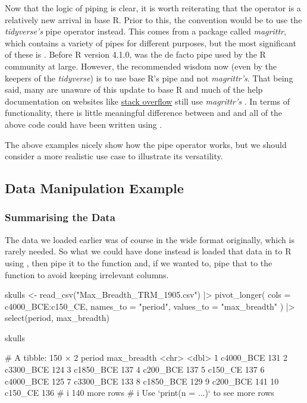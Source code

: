 Now that the logic of piping is clear, it is worth reiterating that the \R{|>} operator is a relatively new arrival in base R. Prior to this, the convention would be to use the \textit{tidyverse's} pipe operator \R{\%>\%} instead. This comes from a package called \textit{magrittr}, which contains a variety of pipes for different purposes, but the most significant of these is \R{\%>\%}. Before R version  4.1.0, \R{\%>\%} was the de facto pipe used by the R community at large. However, the recommended wisdom now (even by the keepers of the \textit{tidyverse}) is to use base R's pipe and not \textit{magrittr's}. That being said, many are unaware of this update to base R and much of the help documentation on websites like \href{https://stackoverflow.com/}{stack overflow} still use \textit{magrittr's} \R{\%>\%}. In terms of functionality, there is little meaningful difference between \R{|>} and \R{\%>\%} and all of the above code could have been written using \R{\%>\%}.

The above examples nicely show how the pipe operator works, but we should consider a more realistic use case to illustrate its versatility. 

\subsection{Data Manipulation Example}

\subsubsection{Summarising the Data}

The  data we loaded earlier was of course in the wide format originally, which is rarely needed. So what we could have done instead is loaded that data in to R using , then pipe it to the  function and, if we wanted to, pipe that to the  function to avoid keeping irrelevant columns.

\begin{inR}
skulls <- read_csv("Max_Breadth_TRM_1905.csv") |>
  pivot_longer(
    cols = c4000_BCE:c150_CE,
    names_to = "period",
    values_to = "max_breadth"
  ) |>
  select(period, max_breadth)

skulls
\end{inR}
\begin{outR}
# A tibble: 150 × 2
   period    max_breadth
   <chr>           <dbl>
 1 c4000_BCE         131
 2 c3300_BCE         124
 3 c1850_BCE         137
 4 c200_BCE          137
 5 c150_CE           137
 6 c4000_BCE         125
 7 c3300_BCE         133
 8 c1850_BCE         129
 9 c200_BCE          141
10 c150_CE           136
# i 140 more rows
# i Use `print(n = ...)` to see more rows
\end{outR}


